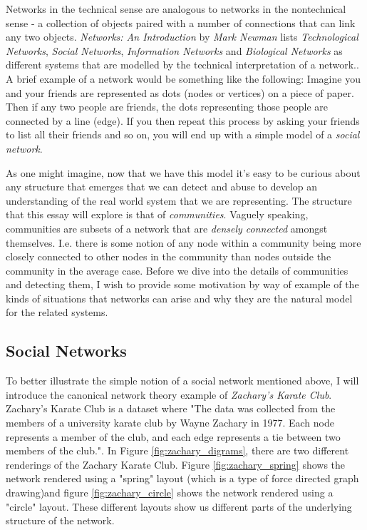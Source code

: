 Networks in the technical sense are analogous to networks in the nontechnical sense - a collection of objects paired with a number of connections that can link any two objects. \emph{Networks: An Introduction} by \emph{Mark Newman} lists \emph{Technological Networks}, \emph{Social Networks}, \emph{Information Networks} and \emph{Biological Networks} as different systems that are modelled by the technical interpretation of a network.\cite[Contents]{newman10}. A brief example of a network would be something like the following: Imagine you and your friends are represented as dots (nodes or vertices) on a piece of paper. Then if any two people are friends, the dots representing those people are connected by a line (edge). If you then repeat this process by asking your friends to list all their friends and so on, you will end up with a simple model of a \emph{social network}.

As one might imagine, now that we have this model it's easy to be curious about any structure that emerges that we can detect and abuse to develop an understanding of the real world system that we are representing. The structure that this essay will explore is that of \emph{communities}. Vaguely speaking, communities are subsets of a network that are \emph{densely connected} amongst themselves. I.e. there is some notion of any node within a community being more closely connected to other nodes in the community than nodes outside the community in the average case. Before we dive into the details of communities and detecting them, I wish to provide some motivation by way of example of the kinds of situations that networks can arise and why they are the natural model for the related systems.

\subsection{Social Networks}\label{sec:Social Networks}
To better illustrate the simple notion of a social network mentioned above, I will introduce the canonical network theory example of \emph{Zachary's Karate Club}. Zachary's Karate Club is a dataset where "The data was collected from the members of a university karate club by Wayne Zachary in 1977.  Each node represents a member of the club, and each edge represents a tie between two members of the club."\cite[Metadata]{konect:2017:ucidata-zachary}. In Figure \ref{fig:zachary_digrams}, there are two different renderings of the Zachary Karate Club. Figure \ref{fig:zachary_spring} shows the network rendered using a "spring" layout (which is a type of force directed graph drawing\cite{kobourov12})and figure \ref{fig:zachary_circle} shows the network rendered using a "circle" layout. These different layouts show us different parts of the underlying structure of the network. 

